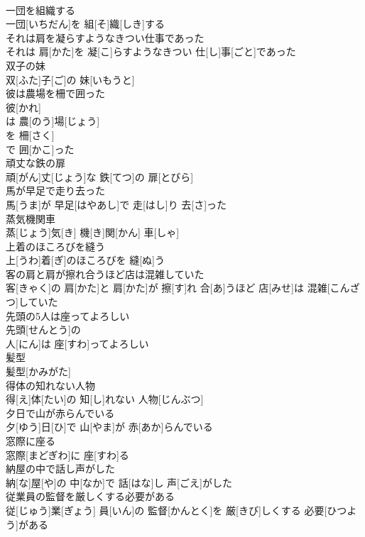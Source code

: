\documentclass[8pt]{extreport}
\begin{document}
\begin{CJK}{UTF8}{min}
\\	一団を組織する	
\\	一団[いちだん]を 組[そ]織[しき]する
\\	それは肩を凝らすようなきつい仕事であった	
\\	それは 肩[かた]を 凝[こ]らすようなきつい 仕[し]事[ごと]であった
\\	双子の妹	
\\	双[ふた]子[ご]の 妹[いもうと]
\\	彼は農場を柵で囲った	
\\	彼[かれ]
\\	は 農[のう]場[じょう]
\\	を 柵[さく]
\\	で 囲[かこ]った 
\\	頑丈な鉄の扉	
\\	頑[がん]丈[じょう]な 鉄[てつ]の 扉[とびら]
\\	馬が早足で走り去った	
\\	馬[うま]が 早足[はやあし]で 走[はし]り 去[さ]った
\\	蒸気機関車	
\\	蒸[じょう]気[き] 機[き]関[かん] 車[しゃ]
\\	上着のほころびを縫う	
\\	上[うわ]着[ぎ]のほころびを 縫[ぬ]う
\\	客の肩と肩が擦れ合うほど店は混雑していた	
\\	客[きゃく]の 肩[かた]と 肩[かた]が 擦[す]れ 合[あ]うほど 店[みせ]は 混雑[こんざつ]していた
\\	先頭の5人は座ってよろしい	
\\	先頭[せんとう]の 
\\	人[にん]は 座[すわ]ってよろしい
\\	髪型	
\\	髪型[かみがた]
\\	得体の知れない人物	
\\	得[え]体[たい]の 知[し]れない 人物[じんぶつ]
\\	夕日で山が赤らんでいる	
\\	夕[ゆう]日[ひ]で 山[やま]が 赤[あか]らんでいる
\\	窓際に座る	
\\	窓際[まどぎわ]に 座[すわ]る
\\	納屋の中で話し声がした	
\\	納[な]屋[や]の 中[なか]で 話[はな]し 声[ごえ]がした
\\	従業員の監督を厳しくする必要がある	
\\	従[じゅう]業[ぎょう] 員[いん]の 監督[かんとく]を 厳[きび]しくする 必要[ひつよう]がある

\end{CJK}
\end{document}
